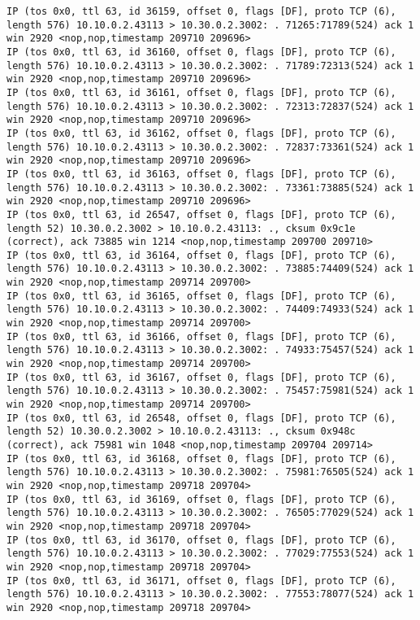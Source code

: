 \documentclass[a4paper,12pt]{article}
\begin{document}
\begin{lstlisting}
IP (tos 0x0, ttl 63, id 36159, offset 0, flags [DF], proto TCP (6), length 576) 10.10.0.2.43113 > 10.30.0.2.3002: . 71265:71789(524) ack 1 win 2920 <nop,nop,timestamp 209710 209696>
IP (tos 0x0, ttl 63, id 36160, offset 0, flags [DF], proto TCP (6), length 576) 10.10.0.2.43113 > 10.30.0.2.3002: . 71789:72313(524) ack 1 win 2920 <nop,nop,timestamp 209710 209696>
IP (tos 0x0, ttl 63, id 36161, offset 0, flags [DF], proto TCP (6), length 576) 10.10.0.2.43113 > 10.30.0.2.3002: . 72313:72837(524) ack 1 win 2920 <nop,nop,timestamp 209710 209696>
IP (tos 0x0, ttl 63, id 36162, offset 0, flags [DF], proto TCP (6), length 576) 10.10.0.2.43113 > 10.30.0.2.3002: . 72837:73361(524) ack 1 win 2920 <nop,nop,timestamp 209710 209696>
IP (tos 0x0, ttl 63, id 36163, offset 0, flags [DF], proto TCP (6), length 576) 10.10.0.2.43113 > 10.30.0.2.3002: . 73361:73885(524) ack 1 win 2920 <nop,nop,timestamp 209710 209696>
IP (tos 0x0, ttl 63, id 26547, offset 0, flags [DF], proto TCP (6), length 52) 10.30.0.2.3002 > 10.10.0.2.43113: ., cksum 0x9c1e (correct), ack 73885 win 1214 <nop,nop,timestamp 209700 209710>
IP (tos 0x0, ttl 63, id 36164, offset 0, flags [DF], proto TCP (6), length 576) 10.10.0.2.43113 > 10.30.0.2.3002: . 73885:74409(524) ack 1 win 2920 <nop,nop,timestamp 209714 209700>
IP (tos 0x0, ttl 63, id 36165, offset 0, flags [DF], proto TCP (6), length 576) 10.10.0.2.43113 > 10.30.0.2.3002: . 74409:74933(524) ack 1 win 2920 <nop,nop,timestamp 209714 209700>
IP (tos 0x0, ttl 63, id 36166, offset 0, flags [DF], proto TCP (6), length 576) 10.10.0.2.43113 > 10.30.0.2.3002: . 74933:75457(524) ack 1 win 2920 <nop,nop,timestamp 209714 209700>
IP (tos 0x0, ttl 63, id 36167, offset 0, flags [DF], proto TCP (6), length 576) 10.10.0.2.43113 > 10.30.0.2.3002: . 75457:75981(524) ack 1 win 2920 <nop,nop,timestamp 209714 209700>
IP (tos 0x0, ttl 63, id 26548, offset 0, flags [DF], proto TCP (6), length 52) 10.30.0.2.3002 > 10.10.0.2.43113: ., cksum 0x948c (correct), ack 75981 win 1048 <nop,nop,timestamp 209704 209714>
IP (tos 0x0, ttl 63, id 36168, offset 0, flags [DF], proto TCP (6), length 576) 10.10.0.2.43113 > 10.30.0.2.3002: . 75981:76505(524) ack 1 win 2920 <nop,nop,timestamp 209718 209704>
IP (tos 0x0, ttl 63, id 36169, offset 0, flags [DF], proto TCP (6), length 576) 10.10.0.2.43113 > 10.30.0.2.3002: . 76505:77029(524) ack 1 win 2920 <nop,nop,timestamp 209718 209704>
IP (tos 0x0, ttl 63, id 36170, offset 0, flags [DF], proto TCP (6), length 576) 10.10.0.2.43113 > 10.30.0.2.3002: . 77029:77553(524) ack 1 win 2920 <nop,nop,timestamp 209718 209704>
IP (tos 0x0, ttl 63, id 36171, offset 0, flags [DF], proto TCP (6), length 576) 10.10.0.2.43113 > 10.30.0.2.3002: . 77553:78077(524) ack 1 win 2920 <nop,nop,timestamp 209718 209704>


\end{lstlisting}
\end{document}
